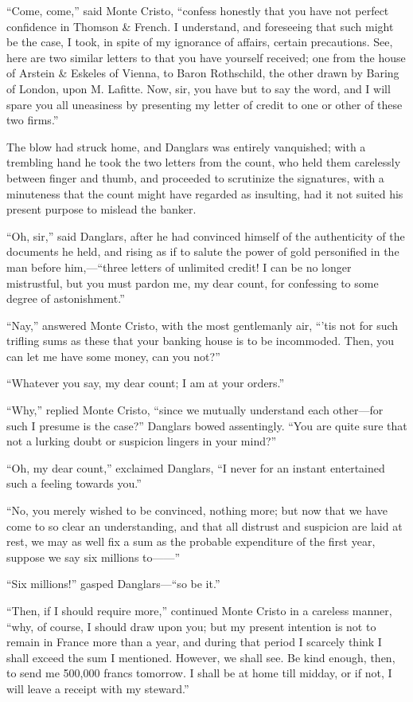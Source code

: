 “Come, come,” said Monte Cristo, “confess honestly that you have not
perfect confidence in Thomson \& French. I understand, and foreseeing
that such might be the case, I took, in spite of my ignorance of
affairs, certain precautions. See, here are two similar letters to that
you have yourself received; one from the house of Arstein \& Eskeles of
Vienna, to Baron Rothschild, the other drawn by Baring of London, upon
M. Lafitte. Now, sir, you have but to say the word, and I will spare
you all uneasiness by presenting my letter of credit to one or other of
these two firms.”

The blow had struck home, and Danglars was entirely vanquished; with a
trembling hand he took the two letters from the count, who held them
carelessly between finger and thumb, and proceeded to scrutinize the
signatures, with a minuteness that the count might have regarded as
insulting, had it not suited his present purpose to mislead the banker.

“Oh, sir,” said Danglars, after he had convinced himself of the
authenticity of the documents he held, and rising as if to salute the
power of gold personified in the man before him,—“three letters of
unlimited credit! I can be no longer mistrustful, but you must pardon
me, my dear count, for confessing to some degree of astonishment.”

“Nay,” answered Monte Cristo, with the most gentlemanly air, “’tis not
for such trifling sums as these that your banking house is to be
incommoded. Then, you can let me have some money, can you not?”

“Whatever you say, my dear count; I am at your orders.”

“Why,” replied Monte Cristo, “since we mutually understand each
other—for such I presume is the case?” Danglars bowed assentingly. “You
are quite sure that not a lurking doubt or suspicion lingers in your
mind?”

“Oh, my dear count,” exclaimed Danglars, “I never for an instant
entertained such a feeling towards you.”

“No, you merely wished to be convinced, nothing more; but now that we
have come to so clear an understanding, and that all distrust and
suspicion are laid at rest, we may as well fix a sum as the probable
expenditure of the first year, suppose we say six millions to——”

“Six millions!” gasped Danglars—“so be it.”

“Then, if I should require more,” continued Monte Cristo in a careless
manner, “why, of course, I should draw upon you; but my present
intention is not to remain in France more than a year, and during that
period I scarcely think I shall exceed the sum I mentioned. However, we
shall see. Be kind enough, then, to send me 500,000 francs tomorrow. I
shall be at home till midday, or if not, I will leave a receipt with my
steward.”

